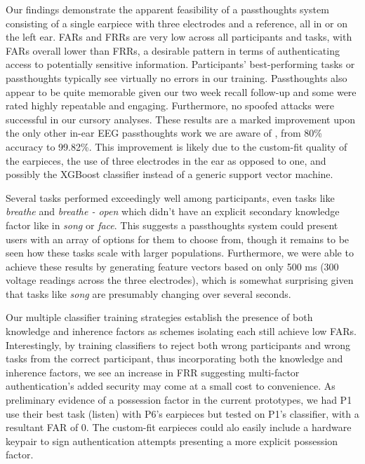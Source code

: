 \documentclass{sigchi}
\begin{document}
Our findings demonstrate the apparent feasibility of a passthoughts system consisting of a single earpiece with three electrodes and a reference, all in or on the left ear. FARs and FRRs are very low across all participants and tasks, with FARs overall lower than FRRs, a desirable pattern in terms of authenticating access to potentially sensitive information. Participants' best-performing tasks or passthoughts typically see virtually no errors in our training. Passthoughts also appear to be quite memorable given our two week recall follow-up and some were rated highly repeatable and engaging. Furthermore, no spoofed attacks were successful in our cursory analyses. These results are a marked improvement upon the only other in-ear EEG passthoughts work we are aware of \cite{curran2016passthoughts}, from 80\% accuracy to 99.82\%. This improvement is likely due to the custom-fit quality of the earpieces, the use of three electrodes in the ear as opposed to one, and possibly the XGBoost classifier instead of a generic support vector machine.

Several tasks performed exceedingly well among participants, even tasks like \textit{breathe} and \textit{breathe - open} which didn't have an explicit secondary knowledge factor like in \textit{song} or \textit{face}. This suggests a passthoughts system could present users with an array of options for them to choose from, though it remains to be seen how these tasks scale with larger populations. Furthermore, we were able to achieve these results by generating feature vectors based on only 500 ms (300 voltage readings across the three electrodes), which is somewhat surprising given that tasks like \textit{song} are presumably changing over several seconds.

Our multiple classifier training strategies establish the presence of both knowledge and inherence factors as schemes isolating each still achieve low FARs. Interestingly, by training classifiers to reject both wrong participants and wrong tasks from the correct participant, thus incorporating both the knowledge and inherence factors, we see an increase in FRR suggesting multi-factor authentication's added security may come at a small cost to convenience. As preliminary evidence of a possession factor in the current prototypes, we had P1 use their best task (listen) with P6's earpieces but tested on P1's classifier, with a resultant FAR of 0. The custom-fit earpieces could alo easily include a hardware keypair to sign authentication attempts presenting a more explicit possession factor.
\end{document}

